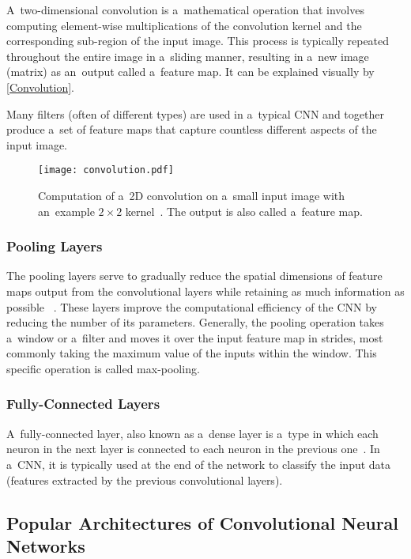 A~two-dimensional convolution is a~mathematical operation that involves
computing element-wise multiplications of the convolution kernel and the
corresponding sub-region of the input image. This process is typically repeated
throughout the entire image in a~sliding manner, resulting in a~new image
(matrix) as an~output called a~feature map. It can be explained visually by
\autoref{Convolution}.

Many filters (often of different types) are used in a~typical CNN and together
produce a~set of feature maps that capture countless different aspects of the
input image.

\begin{figure}[t]
    \centering
    \texttt{[image: convolution.pdf]}
    \captionsetup{width=0.6\textwidth}
    \caption{Computation of a~2D convolution on a~small input image with
    an~example $2 \times 2$ kernel~\cite{zhang2021dive}. The output is also
    called a~feature map.}
    \label{Convolution}
\end{figure}


\subsubsection{Pooling Layers}

The pooling layers serve to gradually reduce the spatial dimensions of feature
maps output from the convolutional layers while retaining as much information as
possible ~\cite{OShea2015}. These layers improve the computational efficiency of
the CNN by reducing the number of its parameters. Generally, the pooling
operation takes a~window or a~filter and moves it over the input feature map in
strides, most commonly taking the maximum value of the inputs within the window.
This specific operation is called max-pooling.


\subsubsection{Fully-Connected Layers}

A~fully-connected layer, also known as a~dense layer is a~type in which each
neuron in the next layer is connected to each neuron in the previous
one~\cite{OShea2015}. In a~CNN, it is typically used at the end of the network
to classify the input data (features extracted by the previous convolutional
layers).


\subsection{Popular Architectures of Convolutional Neural Networks}

